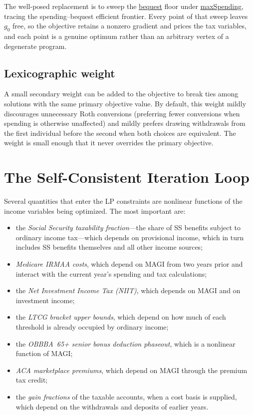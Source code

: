 \documentclass[fleqn,12pt]{report}
\newcommand{\code}[1]{\url{#1}}
\begin{document}
The well-posed replacement is to sweep the \code{bequest} floor under \code{maxSpending},
tracing the spending--bequest efficient frontier.
Every point of that sweep leaves $g_0$ free, so the objective retains a nonzero gradient and
prices the tax variables, and each point is a genuine optimum rather than an arbitrary
vertex of a degenerate program.

\subsection*{Lexicographic weight}

A small secondary weight can be added to the objective to break ties among
solutions with the same primary objective value.
By default, this weight mildly discourages unnecessary Roth conversions
(preferring fewer conversions when spending is otherwise unaffected) and
mildly prefers drawing withdrawals from the first individual before the
second when both choices are equivalent.
The weight is small enough that it never overrides the primary objective.

\section{The Self-Consistent Iteration Loop}
\label{sec:selfconsistent}

Several quantities that enter the LP constraints are nonlinear functions of
the income variables being optimized.
The most important are:

\begin{itemize}[nosep]
  \item the \emph{Social Security taxability fraction}---the share of SS
    benefits subject to ordinary income tax---which depends on provisional
    income, which in turn includes SS benefits themselves and all other
    income sources;
  \item \emph{Medicare IRMAA costs}, which depend on MAGI from two years
    prior and interact with the current year's spending and tax
    calculations;
  \item the \emph{Net Investment Income Tax (NIIT)}, which depends on MAGI
    and on investment income;
  \item the \emph{LTCG bracket upper bounds}, which depend on how much of
    each threshold is already occupied by ordinary income;
  \item the \emph{OBBBA~65+ senior bonus deduction phaseout}, which is a
    nonlinear function of MAGI;
  \item \emph{ACA marketplace premiums}, which depend on MAGI through the
    premium tax credit;
  \item the \emph{gain fractions} of the taxable accounts, when a cost basis is
    supplied, which depend on the withdrawals and deposits of earlier years.
\end{itemize}
\end{document}
